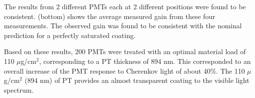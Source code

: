 The results from 2 different PMTs each at 2 different positions were found to be
consistent.  (bottom) shows the average measured gain from these four
measurements. The observed gain was found to be consistent with the nominal
prediction for a perfectly saturated coating.

Based on these results, 200 PMTs were treated \cite{Joosten:2016lcl} with an optimal material load of 110 $\mu$g/cm$^2$,
corresponding to a PT thickness of 894 nm. This corresponded to an overall
increase of the PMT response to Cherenkov light of about 40\%. The 110 $\mu$ g/cm$^2$ (894 nm) of PT provides an
almost transparent coating to the visible light spectrum.





